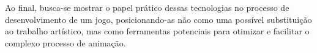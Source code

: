 Ao final, busca-se mostrar o papel prático dessas tecnologias no processo de desenvolvimento de um jogo, posicionando-as não como uma possível substituição ao trabalho artístico, mas como ferramentas potenciais para otimizar e facilitar o complexo processo de animação.

